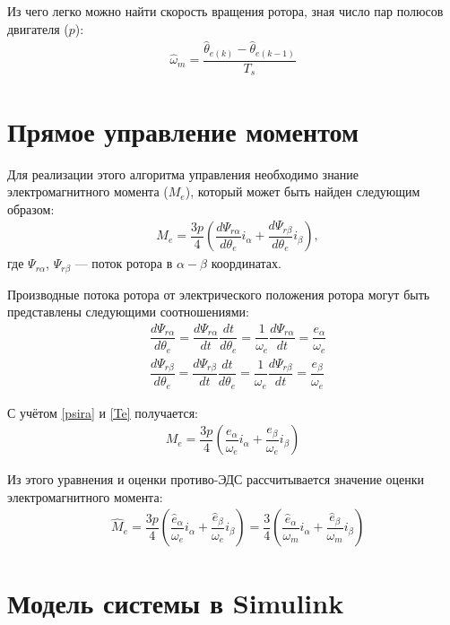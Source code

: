 Из чего легко можно найти скорость вращения ротора, зная число пар полюсов двигателя ($p$):
\begin{align*}
	\hat{\omega}_m = \dfrac{\hat{\theta}_{e(k)}-\hat{\theta}_{e(k-1)}}{T_s}
\end{align*}

\section{Прямое управление моментом}

Для реализации этого алгоритма управления необходимо знание электромагнитного момента ($M_e$), который может быть найден следующим образом\cite{art:dtc_smo}:  
\begin{align}
	\label{Te}
	&M_e=\dfrac{3p}{4}\left(\dfrac{d\Psi_{r\alpha}}{d\theta_e}i_{\alpha}+\dfrac{d\Psi_{r\beta}}{d\theta_e}i_{\beta}\right),
\end{align}где $\Psi_{r\alpha}$, $\Psi_{r\beta}$ --- поток ротора в $\alpha-\beta$ координатах.

Производные потока ротора от электрического положения ротора могут быть представлены следующими соотношениями:
\begin{align}
	\label{psira}
	&\dfrac{d\Psi_{r\alpha}}{d\theta_e}=\dfrac{d\Psi_{r\alpha}}{dt}\dfrac{dt}{d\theta_e}=\dfrac{1}{\omega_e}\dfrac{d\Psi_{r\alpha}}{dt}=\dfrac{e_\alpha}{\omega_e}\\
	&\dfrac{d\Psi_{r\beta}}{d\theta_e}=\dfrac{d\Psi_{r\beta}}{dt}\dfrac{dt}{d\theta_e}=\dfrac{1}{\omega_e}\dfrac{d\Psi_{r\beta}}{dt}=\dfrac{e_\beta}{\omega_e}
\end{align}

С учётом \ref{psira} и \ref{Te} получается:
\begin{align*}
	M_e=\dfrac{3p}{4}\left(\dfrac{e_{\alpha}}{\omega_e}i_{\alpha}+\dfrac{e_{\beta}}{\omega_e}i_{\beta}\right)
\end{align*}

Из этого уравнения и оценки противо-ЭДС рассчитывается значение оценки электромагнитного момента:
\begin{align}
\label{eq:T_e}
	&\hat{M}_e=\dfrac{3p}{4}\left(\dfrac{\hat{e}_{\alpha}}{\omega_e}i_{\alpha}+\dfrac{\hat{e}_{\beta}}{\omega_e}i_{\beta}\right)=\dfrac{3}{4}\left(\dfrac{\hat{e}_{\alpha}}{\omega_m}i_{\alpha}+\dfrac{\hat{e}_{\beta}}{\omega_m}i_{\beta}\right)
\end{align}	
\clearpage

\section{Модель системы в Simulink}

